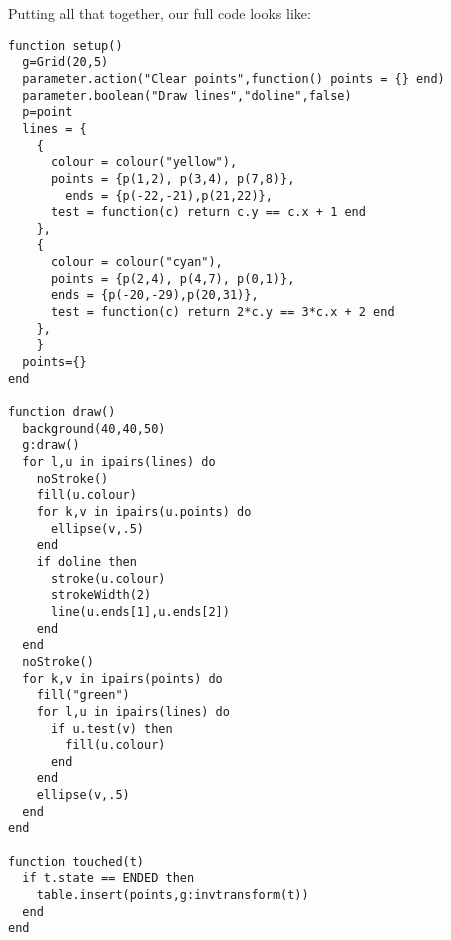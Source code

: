 \documentclass[
  xhtml,%
  use filename%
]{internet}
\begin{document}
Putting all that together, our full code looks like:

\begin{verbatim}
function setup()
  g=Grid(20,5)
  parameter.action("Clear points",function() points = {} end)
  parameter.boolean("Draw lines","doline",false)
  p=point
  lines = {
    {
      colour = colour("yellow"),
      points = {p(1,2), p(3,4), p(7,8)},
    	ends = {p(-22,-21),p(21,22)},
      test = function(c) return c.y == c.x + 1 end
    },
    {
      colour = colour("cyan"),
      points = {p(2,4), p(4,7), p(0,1)},
      ends = {p(-20,-29),p(20,31)},
      test = function(c) return 2*c.y == 3*c.x + 2 end
    },
	}
  points={}
end

function draw()
  background(40,40,50)
  g:draw()
  for l,u in ipairs(lines) do
    noStroke()
    fill(u.colour)
    for k,v in ipairs(u.points) do
      ellipse(v,.5)
    end
    if doline then
      stroke(u.colour)
      strokeWidth(2)
      line(u.ends[1],u.ends[2])
    end
  end
  noStroke()
  for k,v in ipairs(points) do
    fill("green")
    for l,u in ipairs(lines) do
      if u.test(v) then
        fill(u.colour)
      end
    end
    ellipse(v,.5)
  end
end

function touched(t)
  if t.state == ENDED then
    table.insert(points,g:invtransform(t))
  end
end
\end{verbatim}
\end{document}
